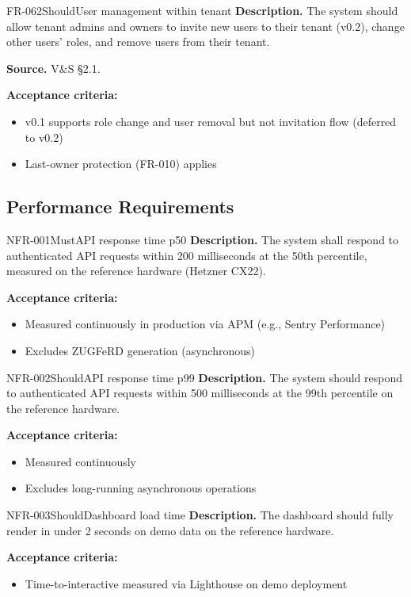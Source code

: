 \documentclass[11pt,a4paper]{article}
\begin{document}
\begin{requirement}{FR-062}{Should}{User management within tenant}
\textbf{Description.} The system should allow tenant admins and owners to invite new users to their tenant (v0.2), change other users' roles, and remove users from their tenant.

\textbf{Source.} V\&S \S2.1.

\textbf{Acceptance criteria:}
\begin{itemize}
    \item v0.1 supports role change and user removal but not invitation flow (deferred to v0.2)
    \item Last-owner protection (FR-010) applies
\end{itemize}
\end{requirement}

\subsection{Performance Requirements}

\begin{requirement}{NFR-001}{Must}{API response time p50}
\textbf{Description.} The system shall respond to authenticated API requests within 200 milliseconds at the 50th percentile, measured on the reference hardware (Hetzner CX22).

\textbf{Acceptance criteria:}
\begin{itemize}
    \item Measured continuously in production via APM (e.g., Sentry Performance)
    \item Excludes ZUGFeRD generation (asynchronous)
\end{itemize}
\end{requirement}

\begin{requirement}{NFR-002}{Should}{API response time p99}
\textbf{Description.} The system should respond to authenticated API requests within 500 milliseconds at the 99th percentile on the reference hardware.

\textbf{Acceptance criteria:}
\begin{itemize}
    \item Measured continuously
    \item Excludes long-running asynchronous operations
\end{itemize}
\end{requirement}

\begin{requirement}{NFR-003}{Should}{Dashboard load time}
\textbf{Description.} The dashboard should fully render in under 2 seconds on demo data on the reference hardware.

\textbf{Acceptance criteria:}
\begin{itemize}
    \item Time-to-interactive measured via Lighthouse on demo deployment
\end{itemize}
\end{requirement}
\end{document}
